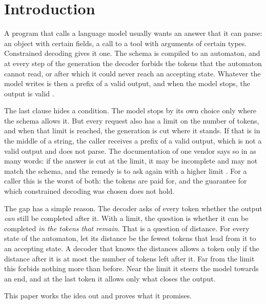 \documentclass[acmsmall,nonacm,screen]{acmart}
\begin{document}
\section{Introduction}

A program that calls a language model usually wants an answer that it can parse: an object
with certain fields, a call to a tool with arguments of certain types. Constrained decoding
gives it one. The schema is compiled to an automaton, and at every step of the generation
the decoder forbids the tokens that the automaton cannot read, or after which it could never
reach an accepting state. Whatever the model writes is then a prefix of a valid output, and
when the model stops, the output is valid
\citep{Willard2023,Geng2023,Koo2024}.

The last clause hides a condition. The model stops by its own choice only where the schema
allows it. But every request also has a limit on the number of tokens, and when that limit
is reached, the generation is cut where it stands. If that is in the middle of a string, the
caller receives a prefix of a valid output, which is not a valid output and does not parse.
The documentation of one vendor says so in as many words: if the answer is cut at the limit,
it may be incomplete and may not match the schema, and the remedy is to ask again with a
higher limit \citep{claudestructured}. For a caller this is the worst of both: the tokens are
paid for, and the guarantee for which constrained decoding was chosen does not hold.

The gap has a simple reason. The decoder asks of every token whether the output \emph{can}
still be completed after it. With a limit, the question is whether it can be completed
\emph{in the tokens that remain}. That is a question of distance. For every state of the
automaton, let its distance be the fewest tokens that lead from it to an accepting state. A
decoder that knows the distances allows a token only if the distance after it is at most the
number of tokens left after it. Far from the limit this forbids nothing more than before.
Near the limit it steers the model towards an end, and at the last token it allows only what
closes the output.

This paper works the idea out and proves what it promises.
\end{document}
